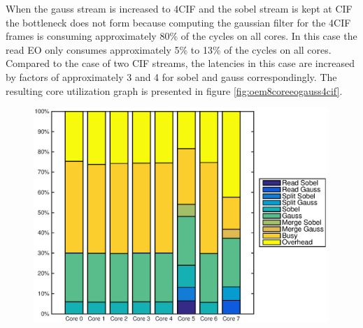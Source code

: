 When the gauss stream is increased to 4CIF and the sobel stream is kept at CIF
the bottleneck does not form because computing the gaussian filter for the 4CIF
frames is consuming approximately 80\% of the cycles on all cores. In this case
the read EO only consumes approximately 5\% to 13\% of the cycles on all cores.
Compared to the case of two CIF streams, the latencies in this case are
increased by factors of approximately 3 and 4 for sobel and gauss
correspondingly. The resulting core utilization graph is presented in figure
\ref{fig:oem8coreeogauss4cif}.

\begin{figure}
    \begin{center}
        \includegraphics[width=0.99\textwidth]{images/preesm_cifcif.eps}
         \label{fig:preesmcif}
    \end{center}
\end{figure}

